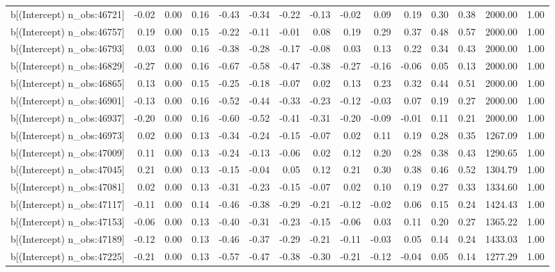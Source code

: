 \begin{table}[ht]
\begin{tabular}{rrrrrrrrrrrrrrr}
  b[(Intercept) n\_obs:46721] & -0.02 & 0.00 & 0.16 & -0.43 & -0.34 & -0.22 & -0.13 & -0.02 & 0.09 & 0.19 & 0.30 & 0.38 & 2000.00 & 1.00 \\ 
  b[(Intercept) n\_obs:46757] & 0.19 & 0.00 & 0.15 & -0.22 & -0.11 & -0.01 & 0.08 & 0.19 & 0.29 & 0.37 & 0.48 & 0.57 & 2000.00 & 1.00 \\ 
  b[(Intercept) n\_obs:46793] & 0.03 & 0.00 & 0.16 & -0.38 & -0.28 & -0.17 & -0.08 & 0.03 & 0.13 & 0.22 & 0.34 & 0.43 & 2000.00 & 1.00 \\ 
  b[(Intercept) n\_obs:46829] & -0.27 & 0.00 & 0.16 & -0.67 & -0.58 & -0.47 & -0.38 & -0.27 & -0.16 & -0.06 & 0.05 & 0.13 & 2000.00 & 1.00 \\ 
  b[(Intercept) n\_obs:46865] & 0.13 & 0.00 & 0.15 & -0.25 & -0.18 & -0.07 & 0.02 & 0.13 & 0.23 & 0.32 & 0.44 & 0.51 & 2000.00 & 1.00 \\ 
  b[(Intercept) n\_obs:46901] & -0.13 & 0.00 & 0.16 & -0.52 & -0.44 & -0.33 & -0.23 & -0.12 & -0.03 & 0.07 & 0.19 & 0.27 & 2000.00 & 1.00 \\ 
  b[(Intercept) n\_obs:46937] & -0.20 & 0.00 & 0.16 & -0.60 & -0.52 & -0.41 & -0.31 & -0.20 & -0.09 & -0.01 & 0.11 & 0.21 & 2000.00 & 1.00 \\ 
  b[(Intercept) n\_obs:46973] & 0.02 & 0.00 & 0.13 & -0.34 & -0.24 & -0.15 & -0.07 & 0.02 & 0.11 & 0.19 & 0.28 & 0.35 & 1267.09 & 1.00 \\ 
  b[(Intercept) n\_obs:47009] & 0.11 & 0.00 & 0.13 & -0.24 & -0.13 & -0.06 & 0.02 & 0.12 & 0.20 & 0.28 & 0.38 & 0.43 & 1290.65 & 1.00 \\ 
  b[(Intercept) n\_obs:47045] & 0.21 & 0.00 & 0.13 & -0.15 & -0.04 & 0.05 & 0.12 & 0.21 & 0.30 & 0.38 & 0.46 & 0.52 & 1304.79 & 1.00 \\ 
  b[(Intercept) n\_obs:47081] & 0.02 & 0.00 & 0.13 & -0.31 & -0.23 & -0.15 & -0.07 & 0.02 & 0.10 & 0.19 & 0.27 & 0.33 & 1334.60 & 1.00 \\ 
  b[(Intercept) n\_obs:47117] & -0.11 & 0.00 & 0.14 & -0.46 & -0.38 & -0.29 & -0.21 & -0.12 & -0.02 & 0.06 & 0.15 & 0.24 & 1424.43 & 1.00 \\ 
  b[(Intercept) n\_obs:47153] & -0.06 & 0.00 & 0.13 & -0.40 & -0.31 & -0.23 & -0.15 & -0.06 & 0.03 & 0.11 & 0.20 & 0.27 & 1365.22 & 1.00 \\ 
  b[(Intercept) n\_obs:47189] & -0.12 & 0.00 & 0.13 & -0.46 & -0.37 & -0.29 & -0.21 & -0.11 & -0.03 & 0.05 & 0.14 & 0.24 & 1433.03 & 1.00 \\ 
  b[(Intercept) n\_obs:47225] & -0.21 & 0.00 & 0.13 & -0.57 & -0.47 & -0.38 & -0.30 & -0.21 & -0.12 & -0.04 & 0.05 & 0.14 & 1277.29 & 1.00 \\ 

\end{tabular}
\end{table}
